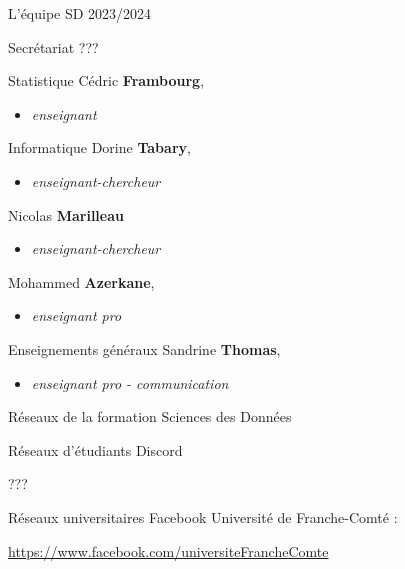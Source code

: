 \documentclass [xcolor=x11names,t] {beamer}
\begin{document}
\begin{frame}{L'équipe SD 2023/2024}

\begin{minipage}{0.4\textwidth}
\begin{block}{Secrétariat}
    ???
\end{block}
\begin{block}{Statistique}
    Cédric \textbf{Frambourg},
    \begin{itemize}
        \item \textcolor{gray!50!black}{\textit{enseignant}}
    \end{itemize}
\end{block}
\end{minipage}\hfill
\begin{minipage}{0.55\textwidth}
\begin{block}{Informatique}
    Dorine \textbf{Tabary},
    \begin{itemize}
        \item \textcolor{gray!50!black}{\textit{enseignant-chercheur}}
    \end{itemize}
    Nicolas \textbf{Marilleau}
    \begin{itemize}
        \item \textcolor{gray!50!black}{\textit{enseignant-chercheur}}
    \end{itemize}
    Mohammed \textbf{Azerkane}, 
    \begin{itemize}
        \item \textcolor{gray!50!black}{\textit{enseignant pro}}
    \end{itemize}
\end{block}
\begin{block}{Enseignements généraux}
Sandrine \textbf{Thomas}, 
    \begin{itemize}
        \item \textcolor{gray!50!black}{\textit{enseignant pro - communication}}
    \end{itemize}
\end{block}
\end{minipage}
    
\end{frame}

\begin{frame}{Réseaux de la formation  Sciences des Données} %
\begin{block}{Réseaux d'étudiants}
    Discord
    
    ???
\end{block}
\begin{block}{Réseaux universitaires}
   Facebook Université de Franche-Comté :
   
   \small \textcolor{myuniversity}{\url{https://www.facebook.com/universiteFrancheComte}}
\end{block}

\end{frame}
\end{document}

